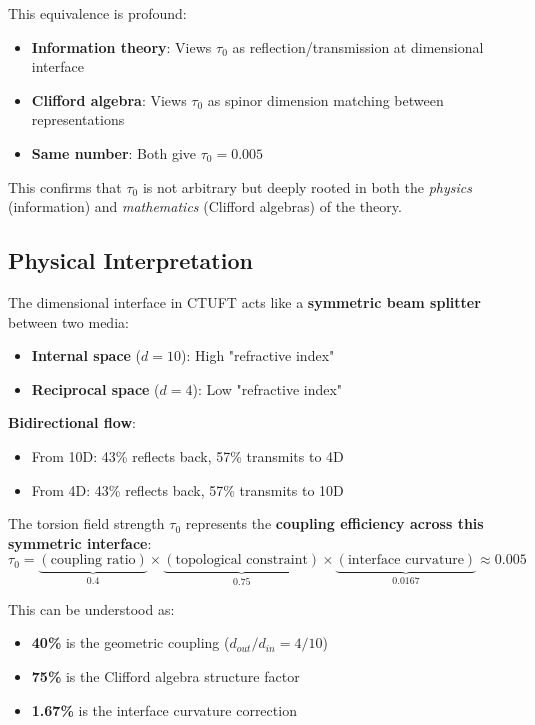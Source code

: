 This equivalence is profound:
\begin{itemize}
    \item \textbf{Information theory}: Views $\tau_0$ as reflection/transmission at dimensional interface
    \item \textbf{Clifford algebra}: Views $\tau_0$ as spinor dimension matching between representations
    \item \textbf{Same number}: Both give $\tau_0 = 0.005$
\end{itemize}

This confirms that $\tau_0$ is not arbitrary but deeply rooted in both the \textit{physics} (information) and \textit{mathematics} (Clifford algebras) of the theory.

\subsection{Physical Interpretation}

\begin{insight}
The dimensional interface in CTUFT acts like a \textbf{symmetric beam splitter} between two media:
\begin{itemize}
    \item \textbf{Internal space} ($d=10$): High "refractive index"
    \item \textbf{Reciprocal space} ($d=4$): Low "refractive index"
\end{itemize}

\textbf{Bidirectional flow}:
\begin{itemize}
    \item From 10D: 43\% reflects back, 57\% transmits to 4D
    \item From 4D: 43\% reflects back, 57\% transmits to 10D
\end{itemize}

The torsion field strength $\tau_0$ represents the \textbf{coupling efficiency across this symmetric interface}:
\begin{equation}
    \tau_0 = \underbrace{(\text{coupling ratio})}_{0.4} \times \underbrace{(\text{topological constraint})}_{0.75} \times \underbrace{(\text{interface curvature})}_{0.0167} \approx 0.005
\end{equation}
\end{insight}

This can be understood as:
\begin{itemize}
    \item \textbf{40\%} is the geometric coupling ($d_{out}/d_{in} = 4/10$)
    \item \textbf{75\%} is the Clifford algebra structure factor
    \item \textbf{1.67\%} is the interface curvature correction
\end{itemize}

